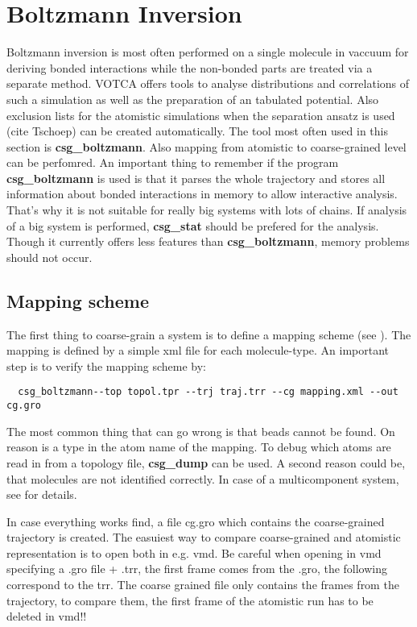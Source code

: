 \section{Boltzmann Inversion}
Boltzmann inversion is most often performed on a single molecule in vaccuum for deriving bonded interactions while the non-bonded parts are treated via a separate method. VOTCA offers tools to analyse distributions and correlations of such a simulation as well as the preparation of an tabulated potential. Also exclusion lists for the atomistic simulations when the separation ansatz is used (cite Tschoep) can be created automatically. The tool most often used in this section is \textbf{csg\_boltzmann}. Also mapping from atomistic to coarse-grained level can be perfomred. An important thing to remember if the program \textbf{csg\_boltzmann} is used is that it parses the whole trajectory and stores all information about bonded interactions in memory to allow interactive analysis. That's why it is not suitable for really big systems with lots of chains. If analysis of a big system is performed, \textbf{csg\_stat} should be prefered for the analysis. Though it currently offers less features than \textbf{csg\_boltzmann}, memory problems should not occur.

\subsection{Mapping scheme}
The first thing to coarse-grain a system is to define a mapping scheme (see ). The mapping is defined by a simple xml file for each molecule-type. An important step is to verify the mapping scheme by:

\begin{verbatim}
  csg_boltzmann--top topol.tpr --trj traj.trr --cg mapping.xml --out cg.gro
\end{verbatim}

The most common thing that can go wrong is that beads cannot be found. On reason is a type in the atom name of the mapping. To debug which atoms are read in from a topology file, \textbf{csg\_dump} can be used. A second reason could be, that molecules are not identified correctly. In case of a multicomponent system, see  for details.

In case everything works find, a file cg.gro which contains the coarse-grained trajectory is created. The easuiest way to compare coarse-grained and atomistic representation is to open both in e.g. vmd.  Be careful when opening in vmd specifying a .gro file + .trr, the first frame comes from the .gro, the following correspond to the trr. The coarse grained file only contains the frames from the trajectory, to compare them, the first frame of the atomistic run has to be deleted in vmd!!

